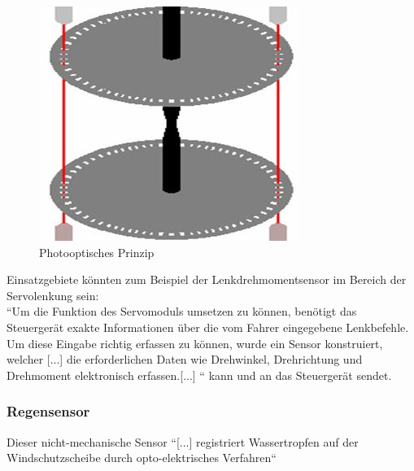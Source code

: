 \begin{enumerate}
	                        \begin{figure}[h]
	                            \centering
	                            \includegraphics{photoelektrisch.png}
	                             \caption[www.kfztech.de/kfztechnik/fahrwerk/lenkung/photoelektrisch.jpg]{Photooptisches Prinzip}
	                             \label{fig:TS05}
	                        \end{figure}	
	            \end{enumerate}
				
				Einsatzgebiete könnten zum Beispiel der Lenkdrehmomentsensor im Bereich der Servolenkung sein: \\
				``Um die Funktion des Servomoduls umsetzen zu können, benötigt das Steuergerät exakte Informationen über die vom Fahrer eingegebene Lenkbefehle. Um diese Eingabe richtig erfassen zu können, wurde ein Sensor konstruiert, welcher [...] die erforderlichen Daten wie Drehwinkel, Drehrichtung und Drehmoment elektronisch erfassen.[...] ``  \cite{TS_dreh} kann und an das Steuergerät sendet.\\
				
				
	            \subsubsection{Regensensor}
	
	                Dieser nicht-mechanische Sensor ``[...] registriert Wassertropfen auf der Windschutzscheibe durch opto-elektrisches Verfahren`` \cite{TS_regen}
	                
